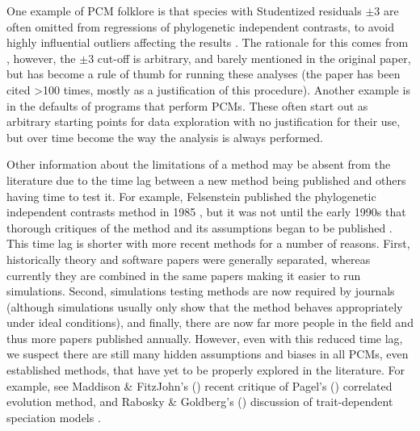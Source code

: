 \documentclass[a4paper,12pt]{article}
\begin{document}
    One example of PCM folklore is that species with Studentized residuals $\pm 3$ are often omitted from regressions of phylogenetic independent contrasts, to avoid highly influential outliers affecting the results \citep[e.g.][]{GEB:GEB355}. 
    The rationale for this comes from \citet{jones1997optimum}, however, the $\pm 3$ cut-off is arbitrary, and barely mentioned in the original paper, but has become a rule of thumb for running these analyses (the paper has been cited \textgreater 100 times, mostly as a justification of this procedure).
    Another example is in the defaults of programs that perform PCMs. 
    These often start out as arbitrary starting points for data exploration with no justification for their use, but over time become the way the analysis is always performed.

    Other information about the limitations of a method may be absent from the literature due to the time lag between a new method being published and others having time to test it. 
    For example, Felsenstein published the phylogenetic independent contrasts method in 1985 \citep{felsenstein1985phylogenies}, but it was not until the early 1990s that thorough critiques of the method and its assumptions began to be published \citep[e.g.][]{garland1992procedures}.
    This time lag is shorter with more recent methods for a number of reasons.
    First, historically theory and software papers were generally separated, whereas currently they are combined in the same papers making it easier to run simulations. 
    Second, simulations testing methods are now required by journals (although simulations usually only show that the method behaves appropriately under ideal conditions), and finally, there are now far more people in the field and thus more papers published annually.
    However, even with this reduced time lag, we suspect there are still many hidden assumptions and biases in all PCMs, even established methods, that have yet to be properly explored in the literature.
    For example, see Maddison \& FitzJohn's (\citeyear{maddison2014unsolved}) recent critique of Pagel's (\citeyear{pagel1994detecting}) correlated evolution method, and Rabosky \& Goldberg's (\citeyear{rabosky2015model}) discussion of trait-dependent speciation models \citep{nee1994reconstructed,maddison2007estimating}.
\end{document}
